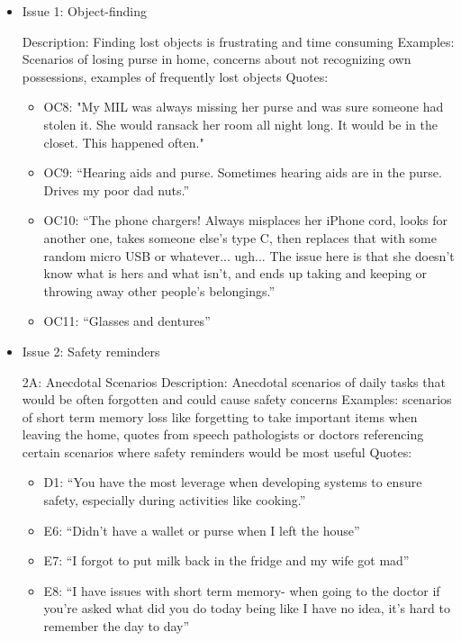 \begin{itemize}


\item Issue 1: Object-finding

Description: Finding lost objects is frustrating and time consuming
Examples: Scenarios of losing purse in home, concerns about not recognizing own possessions, examples of frequently lost objects  
Quotes: 
\begin{itemize}
    \item OC8: "My MIL was always missing her purse and was sure someone had stolen it. She would ransack her room all night long. It would be in the closet. This happened often."
    \item OC9: “Hearing aids and purse. Sometimes hearing aids are in the purse. Drives my poor dad nuts.” 
    \item OC10:  “The phone chargers! Always misplaces her iPhone cord, looks for another one, takes someone else's type C, then replaces that with some random micro USB or whatever... ugh... The issue here is that she doesn't know what is hers and what isn't, and ends up taking and keeping or throwing away other people's belongings.” 
    \item OC11: “Glasses and dentures”  
\end{itemize}




\item Issue 2: Safety reminders

2A: Anecdotal Scenarios
Description: Anecdotal scenarios of daily tasks that would be often forgotten and could cause safety concerns
Examples: scenarios of short term memory loss like forgetting to take important items when leaving the home, quotes from speech pathologists or doctors referencing certain scenarios where safety reminders would be most useful 
Quotes: 
\begin{itemize}
    \item D1: “You have the most leverage when developing systems to ensure safety, especially during activities like cooking.” 
    \item E6: “Didn’t have a wallet or purse when I left the house” 
    \item E7: “I forgot to put milk back in the fridge and my wife got mad”
    \item E8: “I have issues with short term memory- when going to the doctor if you’re asked what did you do today being like I have no idea, it’s hard to remember the day to day” 
\end{itemize}


\end{itemize}
